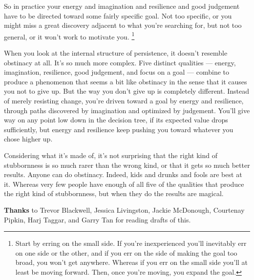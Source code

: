 So in practice your energy and imagination and resilience and good
judgement have to be directed toward some fairly specific goal. Not too
specific, or you might miss a great discovery adjacent to what you're
searching for, but not too general, or it won't work to motivate you.
\footnote{Start by erring on the small side. If you're inexperienced
you'll inevitably err on one side or the other, and if you err on the
side of making the goal too broad, you won't get anywhere. Whereas if
you err on the small side you'll at least be moving forward. Then, once
you're moving, you expand the goal.}

When you look at the internal structure of persistence, it doesn't
resemble obstinacy at all. It's so much more complex. Five distinct
qualities --- energy, imagination, resilience, good judgement, and focus
on a goal --- combine to produce a phenomenon that seems a bit like
obstinacy in the sense that it causes you not to give up. But the way
you don't give up is completely different. Instead of merely resisting
change, you're driven toward a goal by energy and resilience, through
paths discovered by imagination and optimized by judgement. You'll give
way on any point low down in the decision tree, if its expected value
drops sufficiently, but energy and resilience keep pushing you toward
whatever you chose higher up.

Considering what it's made of, it's not surprising that the right kind
of stubbornness is so much rarer than the wrong kind, or that it gets so
much better results. Anyone can do obstinacy. Indeed, kids and drunks
and fools are best at it. Whereas very few people have enough of all
five of the qualities that produce the right kind of stubbornness, but
when they do the results are magical.


\textbf{Thanks} to Trevor Blackwell, Jessica Livingston, Jackie
McDonough, Courtenay Pipkin, Harj Taggar, and Garry Tan for reading
drafts of this.